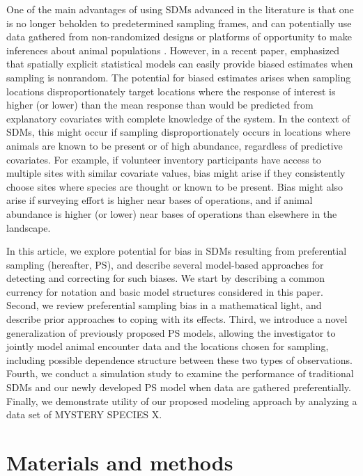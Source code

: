 \documentclass[times,mee,doublespace,]{besauth2}
\begin{document}
One of the main advantages of using SDMs advanced in the literature is that one is no longer beholden to predetermined sampling frames, and can potentially use data gathered from non-randomized designs or platforms of opportunity to make inferences about animal populations \citep{JohnsonEtAl2010}.  However,
in a recent paper, \citet{DiggleEtAl2010} emphasized that spatially explicit statistical models can easily provide biased estimates when sampling is nonrandom. The potential for biased estimates arises when sampling locations disproportionately target locations where the response of interest is higher (or lower) than the mean response than would be predicted from explanatory covariates with complete knowledge of the system.  In the context of SDMs, this might occur if sampling disproportionately occurs in locations where animals are known to be present or of high abundance, regardless of predictive covariates. For example, if volunteer inventory participants have access to multiple sites with similar covariate values, bias might arise if they consistently choose sites where species are thought or known to be present.  Bias might also arise if surveying effort is higher near bases of operations, and if animal abundance is higher (or lower) near bases of operations than elsewhere in the landscape.


In this article, we explore potential for bias in SDMs resulting from preferential sampling (hereafter, PS), and describe several model-based approaches for detecting and correcting for such biases.  We start by describing a common currency for notation and basic model structures considered in this paper.  Second, we review preferential sampling bias in a mathematical light, and describe prior approaches to coping with its effects. Third, we introduce a novel generalization of previously proposed PS models, allowing the investigator to jointly model animal encounter data and the locations chosen for sampling, including possible dependence structure between these two types of observations.  Fourth, we conduct a simulation study to examine the performance of traditional SDMs and our newly developed PS model when data are gathered preferentially.  Finally, we demonstrate utility of our proposed modeling approach by analyzing a data set of MYSTERY SPECIES X.


\section{Materials and methods}
\end{document}
